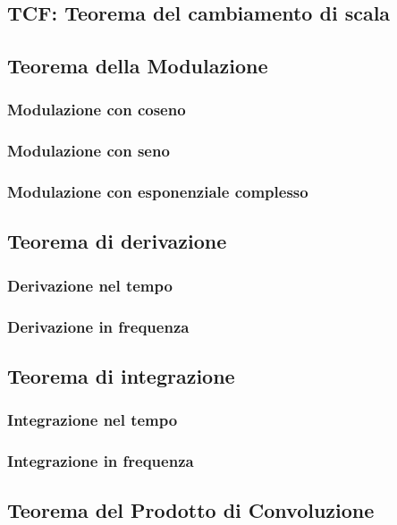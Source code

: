 \documentclass[12pt,oneside,openany]{memoir}
\numberwithin{equation}{subsection}
\begin{document}
\newpage
\subsection{TCF: Teorema del cambiamento di scala}

\newpage
\subsection{Teorema della Modulazione}
\newpage
\subsubsection{Modulazione con coseno}
\newpage
\subsubsection{Modulazione con seno}
\newpage
\subsubsection{Modulazione con esponenziale complesso}

\newpage
\subsection{Teorema di derivazione}
\newpage
\subsubsection{Derivazione nel tempo}
\newpage
\subsubsection{Derivazione in frequenza}

\newpage
\subsection{Teorema di integrazione}
\newpage
\subsubsection{Integrazione nel tempo}
\newpage
\subsubsection{Integrazione in frequenza}

\newpage
\subsection{Teorema del Prodotto di Convoluzione}
\end{document}
